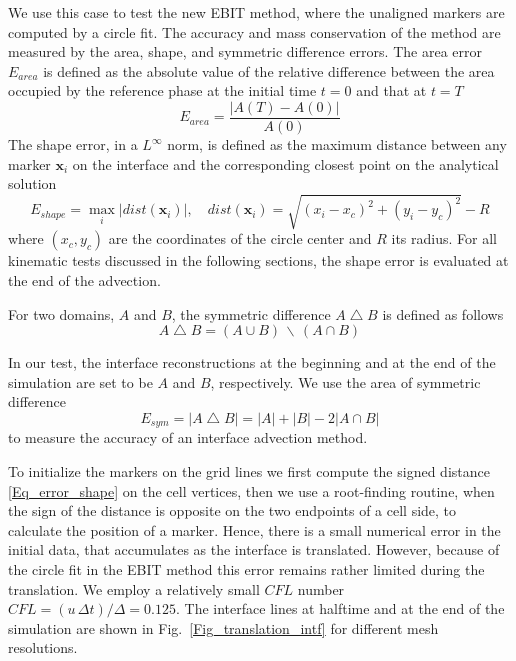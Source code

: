 We use this case to test the new EBIT method, where the unaligned markers are computed by a circle fit. The accuracy and mass conservation of the method are measured by the area, shape, and symmetric difference errors. The area error $E_{area}$ is defined as the absolute value of the relative difference between the area occupied by the reference phase at the initial time $t=0$ and that at $t=T$
\begin{equation}
E_{area} = \frac{|A(T) - A(0)|}{A(0)}
\label{Eq_error_surface}
\end{equation}
The shape error, in a $L^\infty$ norm, is defined as the maximum distance between any marker $\boldsymbol{x}_i$ on the interface and the corresponding closest point on the analytical solution
\begin{equation}
E_{shape} = \max\limits_i |dist (\boldsymbol{x}_i)|, \quad
dist (\boldsymbol{x}_i) = \sqrt{(x_i - x_c)^2 + (y_i - y_c)^2} - R
\label{Eq_error_shape}
\end{equation}
where $(x_c, y_c)$ are the coordinates of the circle center and $R$ its radius. 
For all kinematic tests discussed in the following sections, the shape error is evaluated at the end of the advection.

For two domains, $A$ and $B$, the symmetric difference $A \bigtriangleup B$ is defined as follows
\begin{equation}
A \bigtriangleup B = (A \cup B) \,\backslash\, (A \cap B)
\label{Eq_sym_diff}
\end{equation}

In our test, the interface reconstructions at the beginning and at the end of the simulation are set to be $A$ and $B$, respectively. We use the area of symmetric difference
\begin{equation}
E_{sym} = |A \bigtriangleup B| = |A| + |B| - 2 |A \cap B|
\label{Eq_sym_diff_error}
\end{equation}
to measure the accuracy of an interface advection method.

To initialize the markers on the grid lines we first compute the signed distance \eqref{Eq_error_shape} on the cell vertices, then we use a root-finding routine, when the sign of the distance is opposite on the two endpoints of a cell side, to calculate the position of a marker. Hence, there is a small numerical error in the initial data, that accumulates as the interface is translated. However, because of the circle fit in the EBIT method this error remains rather limited during the translation.
We employ a relatively small $CFL$ number $CFL = (u\,\Delta t)/\Delta = 0.125$. The interface lines at halftime and at the end of the simulation are shown in Fig.~\ref{Fig_translation_intf} for different mesh resolutions. 

